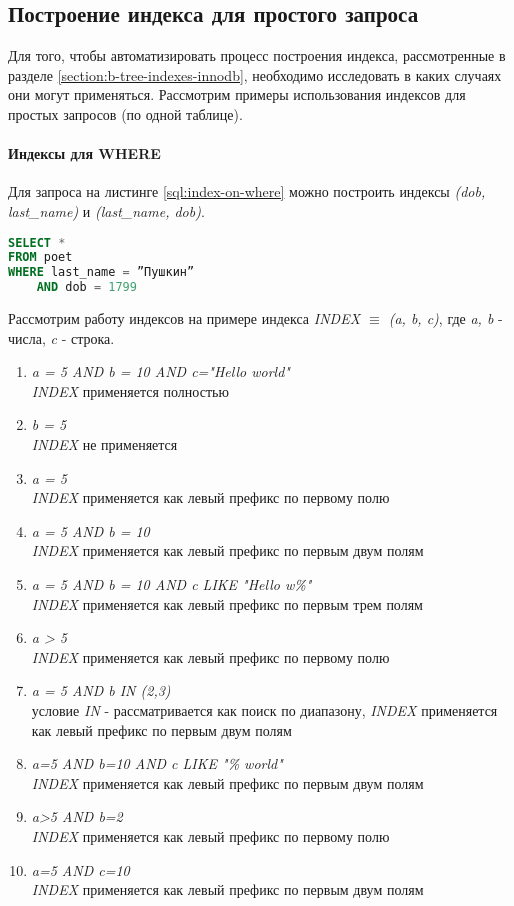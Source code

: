\subsection{Построение индекса для простого запроса}

Для того, чтобы автоматизировать процесс построения индекса, рассмотренные в разделе \ref{section:b-tree-indexes-innodb}, необходимо исследовать в каких случаях они могут применяться. Рассмотрим примеры использования индексов для простых запросов (по одной таблице).


\paragraph{Индексы для WHERE}

Для запроса на листинге \ref{sql:index-on-where} можно построить индексы \textit{(dob, last\_name)} и \textit{(last_name, dob)}.
\begin{lstlisting}[language=sql, label=sql:index-on-where, caption={запрос для index-on-where}]
SELECT * 
FROM poet
WHERE last_name = ”Пушкин” 
    AND dob = 1799
\end{lstlisting}

Рассмотрим работу индексов на примере индекса \textit{INDEX $\equiv$ (a, b, c)}, где \textit{a, b} - числа, \textit{c} - строка.

\begin{enumerate}
\item \textit{a = 5 AND b = 10 AND c="Hello world"} \\  \textit{INDEX} применяется полностью
\item \textit{b = 5} \\   \textit{INDEX} не применяется
\item \textit{a = 5} \\  \textit{INDEX} применяется как левый префикс по первому полю
\item \textit{a = 5 AND b = 10} \\  \textit{INDEX} применяется как левый префикс по первым двум полям
\item \textit{a = 5 AND b = 10 AND c LIKE "Hello w\%"}  \\  \textit{INDEX} применяется как левый префикс по первым трем полям
\item \textit{a > 5} \\  \textit{INDEX} применяется как левый префикс по первому полю
\item \textit{a = 5 AND b IN (2,3)} \\ условие \textit{IN} - рассматривается как поиск по диапазону, \textit{INDEX} применяется как левый префикс по первым двум полям
\item \textit{a=5 AND b=10 AND c LIKE "\% world"} \\  \textit{INDEX} применяется как левый префикс по первым двум полям
\item \textit{a>5 AND b=2} \\ \textit{INDEX} применяется как левый префикс по первому полю
\item \textit{a=5 AND c=10} \\ \textit{INDEX} применяется как левый префикс по первым двум полям
\end{enumerate}


